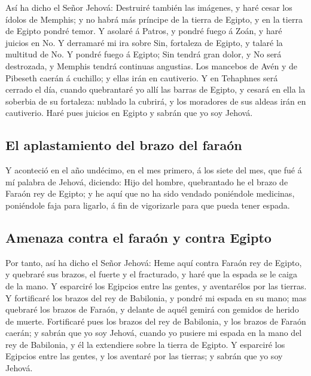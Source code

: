  Así ha dicho el Señor Jehová: Destruiré también las
imágenes, y haré cesar los ídolos de Memphis; y no habrá más príncipe de
la tierra de Egipto, y en la tierra de Egipto pondré temor.
 Y asolaré á Patros, y pondré fuego á Zoán, y haré
juicios en No.  Y derramaré mi ira sobre Sin, fortaleza
de Egipto, y talaré la multitud de No.  Y pondré fuego á
Egipto; Sin tendrá gran dolor, y No será destrozada, y Memphis tendrá
continuas angustias.  Los mancebos de Avén y de Pibeseth
caerán á cuchillo; y ellas irán en cautiverio.  Y en
Tehaphnes será cerrado el día, cuando quebrantaré yo allí las barras de
Egipto, y cesará en ella la soberbia de su fortaleza: nublado la
cubrirá, y los moradores de sus aldeas irán en cautiverio.
 Haré pues juicios en Egipto y sabrán que yo soy Jehová.

\hypertarget{el-aplastamiento-del-brazo-del-farauxf3n}{%
\subsection{El aplastamiento del brazo del
faraón}\label{el-aplastamiento-del-brazo-del-farauxf3n}}

 Y aconteció en el año undécimo, en el mes primero, á los
siete del mes, que fué á mí palabra de Jehová, diciendo: 
Hijo del hombre, quebrantado he el brazo de Faraón rey de Egipto; y he
aquí que no ha sido vendado poniéndole medicinas, poniéndole faja para
ligarlo, á fin de vigorizarle para que pueda tener espada.

\hypertarget{amenaza-contra-el-farauxf3n-y-contra-egipto}{%
\subsection{Amenaza contra el faraón y contra
Egipto}\label{amenaza-contra-el-farauxf3n-y-contra-egipto}}

 Por tanto, así ha dicho el Señor Jehová: Heme aquí
contra Faraón rey de Egipto, y quebraré sus brazos, el fuerte y el
fracturado, y haré que la espada se le caiga de la mano. 
Y esparciré los Egipcios entre las gentes, y aventarélos por las
tierras.  Y fortificaré los brazos del rey de Babilonia,
y pondré mi espada en su mano; mas quebraré los brazos de Faraón, y
delante de aquél gemirá con gemidos de herido de muerte. 
Fortificaré pues los brazos del rey de Babilonia, y los brazos de Faraón
caerán; y sabrán que yo soy Jehová, cuando yo pusiere mi espada en la
mano del rey de Babilonia, y él la extendiere sobre la tierra de Egipto.
 Y esparciré los Egipcios entre las gentes, y los
aventaré por las tierras; y sabrán que yo soy Jehová.

